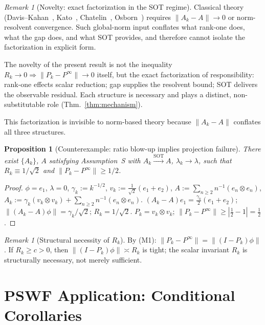 \documentclass[12pt,a4paper]{amsart}
\newtheorem{proposition}[theorem]{Proposition}
\theoremstyle{definition}
\theoremstyle{remark}
\newtheorem{remark}[theorem]{Remark}
\begin{document}
\begin{remark}[Novelty: exact
  factorization in the SOT regime]
\label{rem:abstract-novelty}
Classical theory
(Davis--Kahan~\cite{DavisKahan1970},
Kato~\cite{Kato1966},
Chatelin~\cite{Chatelin1983},
Osborn~\cite{Osborn1975})
requires $\|A_k-A\|\to 0$ or
norm-resolvent convergence.
Such global-norm input conflates
what rank-one does, what the gap does,
and what SOT provides, and therefore
cannot isolate the factorization in
explicit form.

The novelty of the present result is
not the inequality $R_k\to 0
\Rightarrow\|P_k-P^\infty\|\to 0$
itself, but the exact factorization
of responsibility:
rank-one effects scalar reduction;
gap supplies the resolvent bound;
SOT delivers the observable residual.
Each structure is necessary and
plays a distinct, non-substitutable
role (Thm.~\ref{thm:mechanism}).

This factorization is invisible to
norm-based theory because $\|A_k-A\|$
conflates all three structures.
\end{remark}

\begin{proposition}[Counterexample:
  ratio blow-up implies projection
  failure]
\label{prop:counterexample}
There exist $\{A_k\}$, $A$
satisfying Assumption~S with
$A_k\xrightarrow{\mathrm{SOT}} A$,
$\lambda_k\to\lambda$, such that
$R_k\equiv 1/\sqrt{2}$
and
$\|P_k-P^\infty\|\ge 1/2$.
\end{proposition}
\begin{proof}
$\phi=e_1$, $\lambda=0$,
$\gamma_k:=k^{-1/2}$,
$v_k:=\tfrac{1}{\sqrt{2}}(e_1+e_2)$,
$A:=\sum_{n\ge 2}n^{-1}(e_n\otimes e_n)$,
$A_k:=\gamma_k(v_k\otimes v_k)
+\sum_{n\ge 2}n^{-1}(e_n\otimes e_n)$.
$(A_k-A)e_1
=\tfrac{\gamma_k}{2}(e_1+e_2)$;
$\|(A_k-A)\phi\|=\gamma_k/\sqrt{2}$;
$R_k=1/\sqrt{2}$.
$P_k=v_k\otimes v_k$;
$\|P_k-P^\infty\|
\ge|\tfrac{1}{2}-1|=\tfrac{1}{2}$.
\end{proof}

\begin{remark}[Structural necessity
  of $R_k$]
\label{rem:counterexample-meaning}
By (M1): $\|P_k-P^\infty\|
=\|(I-P_k)\phi\|$.
If $R_k\ge c>0$, then
$\|(I-P_k)\phi\|\asymp R_k$ is tight;
the scalar invariant $R_k$ is
structurally necessary, not merely
sufficient.
\end{remark}

\section{PSWF Application:
  Conditional Corollaries}
\label{sec:main}
\end{document}
